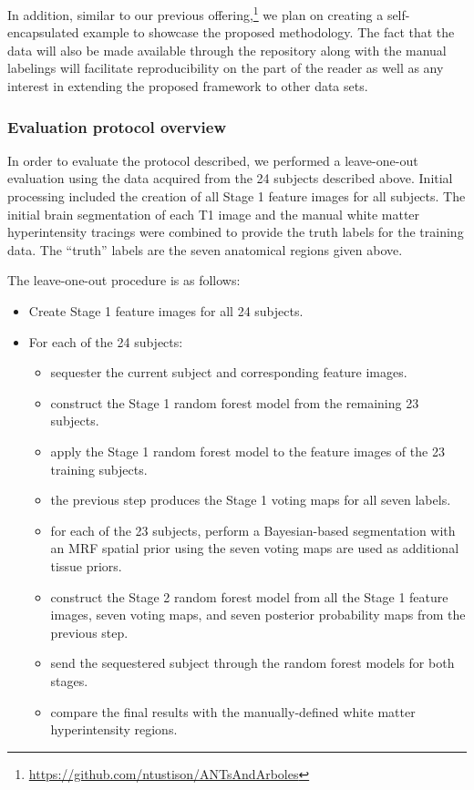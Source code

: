 \documentclass[11pt,]{article}
\providecommand{\tightlist}{%
  \setlength{\itemsep}{0pt}\setlength{\parskip}{0pt}}
\let\rmarkdownfootnote\footnote%
\def\footnote{\protect\rmarkdownfootnote}
\begin{document}
In addition, similar to our previous offering,\footnote{\url{https://github.com/ntustison/ANTsAndArboles}}
we plan on creating a self-encapsulated example to showcase the proposed
methodology. The fact that the data will also be made available through
the
repository along with the manual labelings will facilitate
reproducibility on the part of the reader as well as any interest in
extending the proposed framework to other data sets.

\subsubsection{Evaluation protocol
overview}\label{evaluation-protocol-overview}

In order to evaluate the protocol described, we performed a
leave-one-out evaluation using the data acquired from the 24 subjects
described above. Initial processing included the creation of all Stage 1
feature images for all subjects. The initial brain segmentation of each
T1 image and the manual white matter hyperintensity tracings were
combined to provide the truth labels for the training data. The
``truth'' labels are the seven anatomical regions given above.

The leave-one-out procedure is as follows:

\begin{itemize}
\tightlist
\item
  Create Stage 1 feature images for all 24 subjects.
\item
  For each of the 24 subjects:

  \begin{itemize}
  \tightlist
  \item
    sequester the current subject and corresponding feature images.
  \item
    construct the Stage 1 random forest model from the remaining 23
    subjects.
  \item
    apply the Stage 1 random forest model to the feature images of the
    23 training subjects.
  \item
    the previous step produces the Stage 1 voting maps for all seven
    labels.
  \item
    for each of the 23 subjects, perform a Bayesian-based segmentation
    with an MRF spatial prior using the seven voting maps are used as
    additional tissue priors.
  \item
    construct the Stage 2 random forest model from all the Stage 1
    feature images, seven voting maps, and seven posterior probability
    maps from the previous step.
  \item
    send the sequestered subject through the random forest models for
    both stages.
  \item
    compare the final results with the manually-defined white matter
    hyperintensity regions.
  \end{itemize}
\end{itemize}
\end{document}
